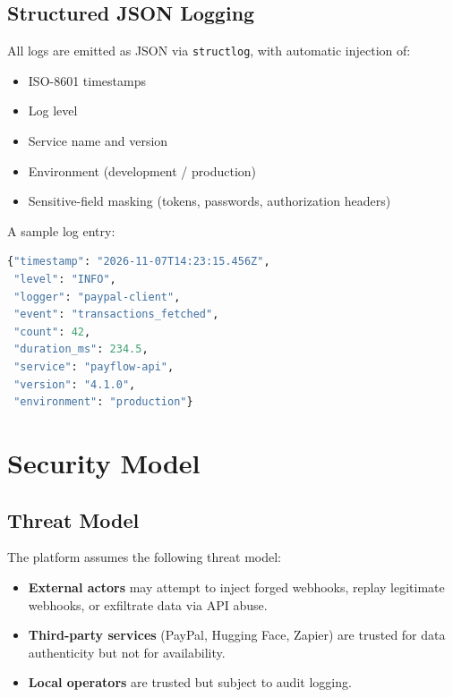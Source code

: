 \documentclass[11pt,a4paper]{article}
\begin{document}
\subsection{Structured JSON Logging}
\label{subsec:logging}

All logs are emitted as JSON via \texttt{structlog}, with automatic injection of:
\begin{itemize}[leftmargin=*]
  \item ISO-8601 timestamps
  \item Log level
  \item Service name and version
  \item Environment (development / production)
  \item Sensitive-field masking (tokens, passwords, authorization headers)
\end{itemize}

A sample log entry:
\begin{lstlisting}[language=Python]
{"timestamp": "2026-11-07T14:23:15.456Z",
 "level": "INFO",
 "logger": "paypal-client",
 "event": "transactions_fetched",
 "count": 42,
 "duration_ms": 234.5,
 "service": "payflow-api",
 "version": "4.1.0",
 "environment": "production"}
\end{lstlisting}


\section{Security Model}
\label{sec:security}

\subsection{Threat Model}
\label{subsec:threat-model}

The platform assumes the following threat model:

\begin{itemize}[leftmargin=*]
  \item \textbf{External actors} may attempt to inject forged webhooks, replay legitimate webhooks, or exfiltrate data via API abuse.
  \item \textbf{Third-party services} (PayPal, Hugging Face, Zapier) are trusted for data authenticity but not for availability.
  \item \textbf{Local operators} are trusted but subject to audit logging.
\end{itemize}
\end{document}
